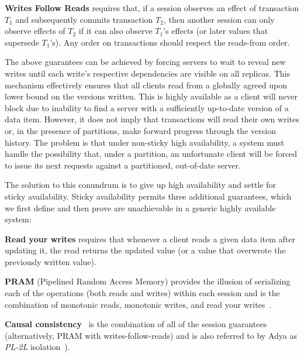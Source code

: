 \vspace{.5em}\noindent\textbf{{Writes Follow Reads}} requires that, if
a session observes an effect of transaction $T_1$ and subsequently
commits transaction $T_2$, then another session can only observe
effects of $T_2$ if it can also observe $T_1$'s effects (or later
values that supersede $T_1$'s).  Any order on transactions should
respect the reads-from order.\vspace{.5em}

The above guarantees can be achieved by forcing servers to wait to
reveal new writes until each write's respective dependencies are
visible on all replicas. This mechanism effectively ensures that all
clients read from a globally agreed upon lower bound on the versions
written. This is highly available as a client will never block due to
inability to find a server with a sufficiently up-to-date version of a
data item. However, it does not imply that transactions will read
their own writes or, in the presence of partitions, make forward
progress through the version history. The problem is that under
non-sticky high availability, a system must handle the possibility
that, under a partition, an unfortunate client will be forced to issue
its next requests against a partitioned, out-of-date server.

The solution to this conundrum is to give up high availability and
settle for sticky availability. Sticky availability permits three
additional guarantees, which we first define and then prove are
unachievable in a generic highly available system:

\vspace{.5em}\noindent\textbf{{Read your writes}} requires that
whenever a client reads a given data item after updating it, the read
returns the updated value (or a value that overwrote the previously
written value).

\vspace{.5em}\noindent\textbf{{PRAM}} (Pipelined Random Access Memory)
provides the illusion of serializing each of the operations (both
reads and writes) within each session and is the combination of
monotonic reads, monotonic writes, and read your
writes~\cite{herlihy-art}.

\vspace{.5em}\noindent\textbf{{Causal
    consistency}}~\cite{causalmemory} is the combination of all of the
session guarantees~\cite{sessiontocausal} (alternatively, PRAM with
writes-follow-reads) and is also referred to by Adya as \textit{PL-2L}
isolation~\cite{adya}).\vspace{.5em}


